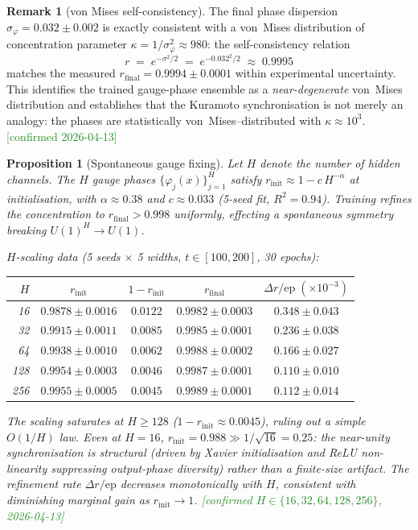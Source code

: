 \documentclass[11pt, a4paper]{article}
\theoremstyle{definition}
\newtheorem{remark}{Remark}[section]
\theoremstyle{plain}
\newtheorem{proposition}[theorem]{Proposition}
\begin{document}
\begin{remark}[von Mises self-consistency]
\label{rem:von_mises}
The final phase dispersion $\sigma_\varphi = 0.032 \pm 0.002$
is exactly consistent with a von~Mises distribution of concentration
parameter $\kappa = 1/\sigma_\varphi^2 \approx 980$: the
self-consistency relation
\[
  r \;=\; e^{-\sigma^2/2} \;=\; e^{-0.032^2/2} \;\approx\; 0.9995
\]
matches the measured
$r_{\mathrm{final}} = 0.9994 \pm 0.0001$ within experimental
uncertainty.  This identifies the trained gauge-phase ensemble as a
\emph{near-degenerate} von~Mises distribution and establishes that
the Kuramoto synchronisation is not merely an analogy: the phases
are statistically von~Mises--distributed with
$\kappa \approx 10^3$.
\textcolor{ForestGreen}{[confirmed 2026-04-13]}
\end{remark}

\begin{proposition}[Spontaneous gauge fixing]
\label{prop:spontaneous_gauge}
Let $H$ denote the number of hidden channels.
The $H$ gauge phases $\{\varphi_j(x)\}_{j=1}^H$ satisfy
$r_{\mathrm{init}} \approx 1 - c\,H^{-\alpha}$ at initialisation,
with $\alpha \approx 0.38$ and $c \approx 0.033$ (5-seed fit,
$R^2=0.94$).  Training refines the concentration to
$r_{\mathrm{final}} > 0.998$ uniformly, effecting a spontaneous
symmetry breaking $U(1)^H \to U(1)$.

\smallskip\noindent\textit{$H$-scaling data
(5 seeds $\times$ 5 widths, $t\in[100,200]$, 30 epochs):}

\smallskip
\begin{center}
\begin{tabular}{rcccc}
\toprule
$H$ & $r_{\mathrm{init}}$ & $1{-}r_{\mathrm{init}}$ &
      $r_{\mathrm{final}}$ & $\Delta r/\mathrm{ep}\;(\times 10^{-3})$ \\
\midrule
 16 & $0.9878\pm0.0016$ & $0.0122$ & $0.9982\pm0.0003$ & $0.348\pm0.043$ \\
 32 & $0.9915\pm0.0011$ & $0.0085$ & $0.9985\pm0.0001$ & $0.236\pm0.038$ \\
 64 & $0.9938\pm0.0010$ & $0.0062$ & $0.9988\pm0.0002$ & $0.166\pm0.027$ \\
128 & $0.9954\pm0.0003$ & $0.0046$ & $0.9987\pm0.0001$ & $0.110\pm0.010$ \\
256 & $0.9955\pm0.0005$ & $0.0045$ & $0.9989\pm0.0001$ & $0.112\pm0.014$ \\
\bottomrule
\end{tabular}
\end{center}

\smallskip\noindent
The scaling saturates at $H\ge128$ ($1{-}r_{\mathrm{init}}\approx 0.0045$),
ruling out a simple $O(1/H)$ law.  Even at $H=16$,
$r_{\mathrm{init}}=0.988 \gg 1/\sqrt{16}=0.25$: the near-unity
synchronisation is \emph{structural} (driven by Xavier initialisation
and ReLU non-linearity suppressing output-phase diversity) rather than
a finite-size artifact.  The refinement rate $\Delta r/\mathrm{ep}$
decreases monotonically with $H$, consistent with diminishing
marginal gain as $r_{\mathrm{init}}\to 1$.
\textcolor{ForestGreen}{[confirmed $H{\in}\{16,32,64,128,256\}$,
2026-04-13]}
\end{proposition}
\end{document}
